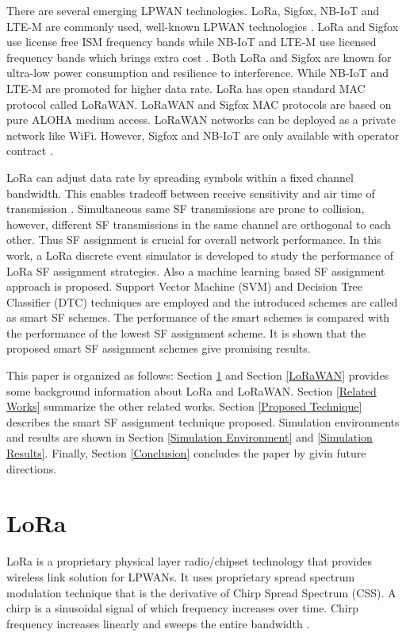 \documentclass[conference]{IEEEtran}
\begin{document}
\par There are several emerging LPWAN technologies. LoRa, Sigfox, NB-IoT and LTE-M are commonly used, well-known LPWAN technologies \cite{7815384}. LoRa and Sigfox use license free ISM frequency bands while NB-IoT and LTE-M use licensed frequency bands which brings extra cost \cite{7815384}. Both LoRa and Sigfox are known for ultra-low power consumption and resilience to interference. While NB-IoT and LTE-M are promoted for higher data rate. LoRa has open standard MAC protocol called LoRaWAN. LoRaWAN and Sigfox MAC protocols are based on pure ALOHA medium access. LoRaWAN networks can be deployed as a private network like WiFi. However, Sigfox and NB-IoT are only available with operator contract \cite{7815384}.

\par LoRa can adjust data rate by spreading symbols within a fixed channel bandwidth. This enables tradeoff between receive sensitivity and air time of transmission \cite{7803607}. Simultaneous same SF transmissions are prone to collision, however, different SF transmissions in the same channel are orthogonal to each other. Thus SF assignment is crucial for overall network performance. In this work, a LoRa discrete event simulator is developed to study the performance of LoRa SF assignment strategies. Also a machine learning based SF assignment approach is proposed. Support Vector Machine (SVM) and Decision Tree Classifier (DTC) techniques are employed and the introduced schemes are called as smart SF schemes. The performance of the smart schemes  is compared with the performance of the lowest SF assignment scheme. It is shown that the proposed smart SF assignment schemes give promising results.

\par This paper is organized as follows: Section \ref{LoRa} and Section \ref{LoRaWAN} provides some background information about LoRa and LoRaWAN. Section \ref{Related Works} summarize  the other related works. Section \ref{Proposed Technique} describes the smart SF assignment technique proposed. Simulation environments and results are shown in Section \ref{Simulation Environment} and \ref{Simulation Results}. Finally, Section \ref{Conclusion} concludes the paper by givin future directions.


\section{LoRa} \label{LoRa}
\par LoRa is a proprietary physical layer radio/chipset technology that provides wireless link solution for LPWANs. It uses proprietary spread spectrum modulation technique that is the derivative of Chirp Spread Spectrum (CSS). A chirp is a sinusoidal signal of which frequency increases over time. Chirp frequency increases linearly and sweeps the entire bandwidth \cite{AN1200.22}.
\end{document}
